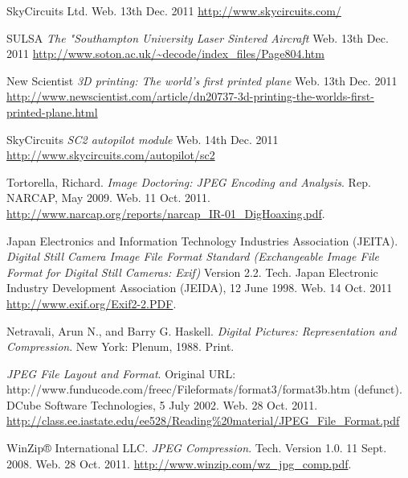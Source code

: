 


\begin{thebibliography}{9}

	 SkyCircuits Ltd. Web. 13th Dec. 2011 \url{http://www.skycircuits.com/}

	 SULSA \emph{The "Southampton University Laser Sintered Aircraft} Web. 13th Dec. 2011 \url{http://www.soton.ac.uk/~decode/index_files/Page804.htm}

	 New Scientist \emph{3D printing: The world's first printed plane} Web. 13th Dec. 2011 \url{http://www.newscientist.com/article/dn20737-3d-printing-the-worlds-first-printed-plane.html}

	 SkyCircuits \emph{SC2 autopilot module} Web. 14th Dec. 2011 \url{http://www.skycircuits.com/autopilot/sc2}

	 Tortorella, Richard. \emph{Image Doctoring: JPEG Encoding and Analysis}. Rep. NARCAP, May 2009. Web. 11 Oct. 2011. \url{http://www.narcap.org/reports/narcap_IR-01_DigHoaxing.pdf}.
	
	 Japan Electronics and Information Technology Industries Association (JEITA). \emph{Digital Still Camera Image File Format Standard (Exchangeable Image File Format for Digital Still Cameras: Exif)} Version 2.2. Tech. Japan Electronic Industry Development Association (JEIDA), 12 June 1998. Web. 14 Oct. 2011 \url{http://www.exif.org/Exif2-2.PDF}.
	
	 Netravali, Arun N., and Barry G. Haskell. \emph{Digital Pictures: Representation and Compression}. New York: Plenum, 1988. Print. 
	
	 \emph{JPEG File Layout and Format}. Original URL: \\http://www.funducode.com/freec/Fileformats/format3/format3b.htm (defunct).\\DCube Software Technologies, 5 July 2002. Web. 28 Oct. 2011. \url{http://class.ee.iastate.edu/ee528/Reading%20material/JPEG_File_Format.pdf}
	
	 WinZip® International LLC. \emph{JPEG Compression}. Tech. Version 1.0. 11 Sept. 2008. Web. 28 Oct. 2011. \url{http://www.winzip.com/wz_jpg_comp.pdf}.
	

\end{thebibliography}
